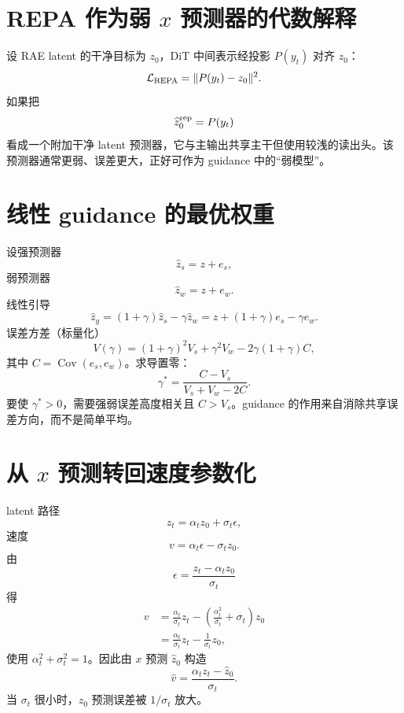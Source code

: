 \documentclass[UTF8,12pt,a4paper,fontset=none]{ctexart}
\numberwithin{equation}{section}
\newcommand{\Loss}{\mathcal{L}}
\begin{document}
\section{REPA 作为弱 $x$ 预测器的代数解释}
设 RAE latent 的干净目标为 $z_0$，DiT 中间表示经投影 $P(y_t)$ 对齐 $z_0$：
\begin{equation}
 \Loss_{\rm REPA}=\|P(y_t)-z_0\|^2.
\end{equation}
如果把
\begin{equation}
 \widehat z_0^{\rm rep}=P(y_t)
\end{equation}
看成一个附加干净 latent 预测器，它与主输出共享主干但使用较浅的读出头。该预测器通常更弱、误差更大，正好可作为 guidance 中的“弱模型”。

\section{线性 guidance 的最优权重}
设强预测器
\begin{equation}
 \widehat z_s=z+e_s,
\end{equation}
弱预测器
\begin{equation}
 \widehat z_w=z+e_w.
\end{equation}
线性引导
\begin{equation}
 \widehat z_g=(1+\gamma)\widehat z_s-
 \gamma\widehat z_w
 =z+(1+\gamma)e_s-\gamma e_w.
\end{equation}
误差方差（标量化）
\begin{equation}
 V(\gamma)=(1+\gamma)^2V_s+
 \gamma^2V_w-2\gamma(1+\gamma)C,
\end{equation}
其中 $C=\operatorname{Cov}(e_s,e_w)$。求导置零：
\begin{equation}
 \gamma^*=\frac{C-V_s}{V_s+V_w-2C}.
\end{equation}
要使 $\gamma^*>0$，需要强弱误差高度相关且 $C>V_s$。guidance 的作用来自消除共享误差方向，而不是简单平均。

\section{从 $x$ 预测转回速度参数化}
latent 路径
\begin{equation}
 z_t=\alpha_tz_0+\sigma_t\epsilon,
\end{equation}
速度
\begin{equation}
 v=\alpha_t\epsilon-\sigma_tz_0.
\end{equation}
由
\begin{equation}
 \epsilon=\frac{z_t-\alpha_tz_0}{\sigma_t}
\end{equation}
得
\begin{align}
 v
 &=\frac{\alpha_t}{\sigma_t}z_t
 -\left(\frac{\alpha_t^2}{\sigma_t}+\sigma_t\right)z_0\\
 &=\frac{\alpha_t}{\sigma_t}z_t-
 \frac1{\sigma_t}z_0,
\end{align}
使用 $\alpha_t^2+\sigma_t^2=1$。因此由 $x$ 预测 $\widehat z_0$ 构造
\begin{equation}
 \widehat v=\frac{\alpha_tz_t-\widehat z_0}{\sigma_t}.
\end{equation}
当 $\sigma_t$ 很小时，$z_0$ 预测误差被 $1/\sigma_t$ 放大。
\end{document}
